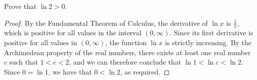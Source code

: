 \begin{exercise}
	Prove that $\ln 2 > 0$.
\end{exercise}
\begin{proof}
	By the Fundamental Theorem of Calculus, the derivative of $\ln x$ is $\frac{1}{x}$, which is positive for all values in the interval $\left( 0, \infty \right)$. Since its first derivative is positive for all values in $\left( 0, \infty \right)$, the function $\ln x$ is strictly increasing. By the Archimedean property of the real numbers, there exists at least one real number $c$ such that $1 < c < 2$, and we can therefore conclude that $\ln 1 < \ln c < \ln 2$. Since $0 = \ln 1$, we have that $0 < \ln 2$, as required.
\end{proof}
